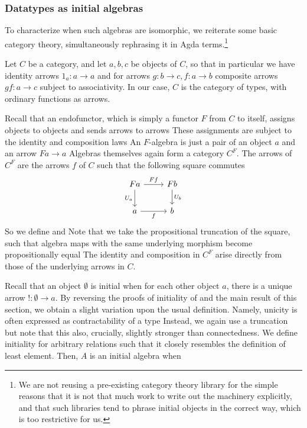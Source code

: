 \subsubsection{Datatypes as initial algebras}
To characterize when such algebras are isomorphic, we reiterate some basic category theory, simultaneously rephrasing it in Agda terms.\footnote{We are not reusing a pre-existing category theory library for the simple reasons that it is not that much work to write out the machinery explicitly, and that such libraries tend to phrase initial objects in the correct way, which is too restrictive for us.}

Let $C$ be a category, and let $a, b, c$ be objects of $C$, so that in particular we have identity arrows $1_a : a \to a$ and for arrows $g : b \to c, f : a \to b$ composite arrows $gf : a \to c$ subject to associativity. In our case, $C$ is the category of types, with ordinary functions as arrows.

Recall that an endofunctor, which is simply a functor $F$ from $C$ to itself, assigns objects to objects and sends arrows to arrows
These assignments are subject to the identity and composition laws
An $F$-algebra is just a pair of an object $a$ and an arrow $Fa \to a$
Algebras themselves again form a category $C^F$. The arrows of $C^F$ are the arrows $f$ of $C$ such that the following square commutes%
\[\begin{tikzcd}[ampersand replacement=\&]
	Fa \& Fb \\
	a \& b
	\arrow["f"', from=2-1, to=2-2]
	\arrow["{U_a}"', from=1-1, to=2-1]
	\arrow["{U_b}", from=1-2, to=2-2]
	\arrow["Ff", from=1-1, to=1-2]
\end{tikzcd}\]
So we define
and
Note that we take the propositional truncation of the square, such that algebra maps with the same underlying morphism become propositionally equal
The identity and composition in $C^F$ arise directly from those of the underlying arrows in $C$.

Recall that an object $\emptyset$ is initial when for each other object $a$, there is a unique arrow $!: \emptyset \to a$. By reversing the proofs of initiality of  and the main result of this section, we obtain a slight variation upon the usual definition. Namely, unicity is often expressed as contractability of a type
Instead, we again use a truncation
but note that this also, crucially, slightly stronger than connectedness. We define initiality for arbitrary relations
such that it closely resembles the definition of least element. Then, $A$ is an initial algebra when

